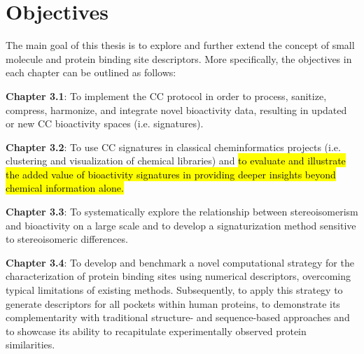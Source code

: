 \chapter{Objectives}
\label{objectives}
\clearpage

The main goal of this thesis is to explore and further extend the concept of small molecule and protein binding site descriptors. More specifically, the objectives in each chapter can be outlined as follows:

\textbf{Chapter 3.1}: To implement the CC protocol in order to process, sanitize, compress, harmonize, and integrate novel bioactivity data, resulting in updated or new CC bioactivity spaces (i.e. signatures). 

\textbf{Chapter 3.2}: To use CC signatures in classical cheminformatics projects (i.e. clustering and visualization of chemical libraries) and \hl{to evaluate and illustrate the added value of bioactivity signatures in providing deeper insights beyond chemical information alone.}

\textbf{Chapter 3.3}: To systematically explore the relationship between stereoisomerism and bioactivity on a large scale and to develop a signaturization method sensitive to stereoisomeric differences. 

\textbf{Chapter 3.4}: To develop and benchmark a novel computational strategy for the characterization of protein binding sites using numerical descriptors, overcoming typical limitations of existing methods. Subsequently, to apply this strategy to generate descriptors for all pockets within human proteins, to demonstrate its complementarity with traditional structure- and sequence-based approaches and to showcase its ability to recapitulate experimentally observed protein similarities.